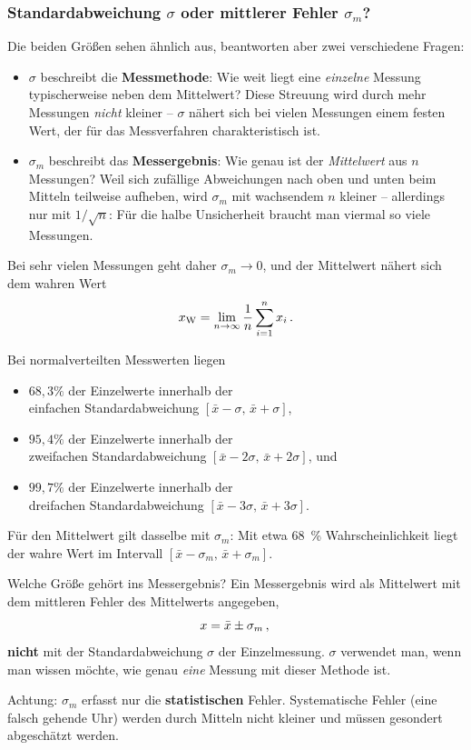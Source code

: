 \subsubsection*{Standardabweichung $\sigma$ oder mittlerer Fehler $\sigma_m$?}
Die beiden Größen sehen ähnlich aus, beantworten aber zwei verschiedene Fragen:
\begin{itemize}[itemsep=1.5pt]
    \item $\sigma$ beschreibt die \textbf{Messmethode}: Wie weit liegt eine \textit{einzelne} Messung typischerweise neben dem Mittelwert? Diese Streuung wird durch mehr Messungen \textit{nicht} kleiner -- $\sigma$ nähert sich bei vielen Messungen einem festen Wert, der für das Messverfahren charakteristisch ist.
    \item $\sigma_m$ beschreibt das \textbf{Messergebnis}: Wie genau ist der \textit{Mittelwert} aus $n$ Messungen? Weil sich zufällige Abweichungen nach oben und unten beim Mitteln teilweise aufheben, wird $\sigma_m$ mit wachsendem $n$ kleiner -- allerdings nur mit $1/\sqrt{n}$: Für die halbe Unsicherheit braucht man viermal so viele Messungen.
\end{itemize}
Bei sehr vielen Messungen geht daher $\sigma_m \to 0$, und der Mittelwert nähert sich dem wahren Wert
\begin{equation}
    x_\mathrm{W} = \lim_{n \rightarrow \infty} \frac{1}{n} \sum_{i=1}^n x_i \,.
\end{equation}

Bei normalverteilten Messwerten liegen
\begin{itemize}[itemsep=1.5pt]
    \item $68,3 \%$ der Einzelwerte innerhalb der \\einfachen Standardabweichung $[\bar{x} - \sigma,\, \bar{x}+\sigma]$,
    \item $95,4\%$ der Einzelwerte innerhalb der \\zweifachen Standardabweichung $[\bar{x} - 2\sigma,\, \bar{x} + 2\sigma]$, und
    \item $99,7\%$ der Einzelwerte innerhalb der \\dreifachen Standardabweichung $[\bar{x} - 3\sigma,\, \bar{x} + 3\sigma]$.
\end{itemize}
Für den Mittelwert gilt dasselbe mit $\sigma_m$: Mit etwa \SI{68}{\percent} Wahrscheinlichkeit liegt der wahre Wert im Intervall $[\bar{x} - \sigma_m,\, \bar{x}+\sigma_m]$.

\begin{rememberbox}[]{Welche Größe gehört ins Messergebnis?}
    Ein Messergebnis wird als Mittelwert mit dem mittleren Fehler des Mittelwerts angegeben,
    \begin{equation*}
        x = \bar{x} \pm \sigma_m \,{,}\,
    \end{equation*}
    \textbf{nicht} mit der Standardabweichung $\sigma$ der Einzelmessung. $\sigma$ verwendet man, wenn man wissen möchte, wie genau \textit{eine} Messung mit dieser Methode ist.

    Achtung: $\sigma_m$ erfasst nur die \textbf{statistischen} Fehler. Systematische Fehler (\zB eine falsch gehende Uhr) werden durch Mitteln nicht kleiner und müssen gesondert abgeschätzt werden.
\end{rememberbox}

